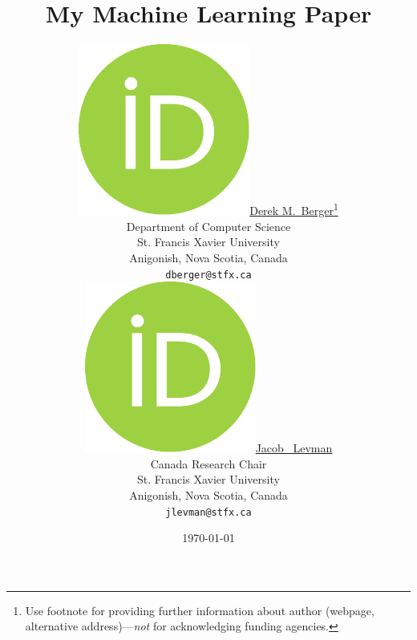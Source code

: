 \title{My Machine Learning Paper}
\date{\today}
\author{ \href{https://orcid.org/0000-0003-4733-0624}{\includegraphics[scale=0.06]{orcid.pdf}\hspace{1mm}Derek M.~Berger}\thanks{Use footnote for providing further
    information about author (webpage, alternative
    address)---\emph{not} for acknowledging funding agencies.} \\
  Department of Computer Science\\
  St. Francis Xavier University\\
  Anigonish, Nova Scotia, Canada \\
  \texttt{dberger@stfx.ca} \\
  \And
  \href{https://orcid.org/0000-0002-9604-3157}{\includegraphics[scale=0.06]{orcid.pdf}\hspace{1mm}Jacob ~Levman} \\
  Canada Research Chair\\
  St. Francis Xavier University\\
  Anigonish, Nova Scotia, Canada \\
  \texttt{jlevman@stfx.ca} \\
}